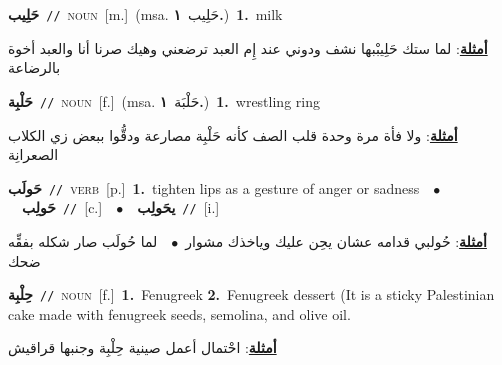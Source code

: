 \documentclass[10pt,a4paper,twoside]{article} %
\begin{document}
\begin{multicols}{2}
{\setlength\topsep{0pt}\textbf{\foreignlanguage{arabic}{حَلِيب}}\ {\color{gray}\texttt{//}\color{black}}\ \textsc{noun}\ [m.]\ \color{gray}(msa. \foreignlanguage{arabic}{حَلِيب}~\foreignlanguage{arabic}{\textbf{١.}})\color{black}\ \textbf{1.}~milk\  \begin{flushright}\color{gray}\foreignlanguage{arabic}{\textbf{\underline{\foreignlanguage{arabic}{أمثلة}}}: لما ستك حَلِيبْبها نشف ودوني عند إِم العبد ترضعني وهيك صرنا أنا والعبد أخوة بالرضاعة}\end{flushright}\color{black}} \vspace{2mm}

{\setlength\topsep{0pt}\textbf{\foreignlanguage{arabic}{حَلْبِة}}\ {\color{gray}\texttt{//}\color{black}}\ \textsc{noun}\ [f.]\ \color{gray}(msa. \foreignlanguage{arabic}{حَلْبَة}~\foreignlanguage{arabic}{\textbf{١.}})\color{black}\ \textbf{1.}~wrestling ring\  \begin{flushright}\color{gray}\foreignlanguage{arabic}{\textbf{\underline{\foreignlanguage{arabic}{أمثلة}}}: ولا فأة مرة وحدة قلب الصف كأنه حَلْبِة مصارعة ودقُّوا ببعض زي الكلاب الصعرانِة}\end{flushright}\color{black}} \vspace{2mm}

{\setlength\topsep{0pt}\textbf{\foreignlanguage{arabic}{حَولَب}}\ {\color{gray}\texttt{//}\color{black}}\ \textsc{verb}\ [p.]\ \textbf{1.}~tighten lips as a gesture of anger or sadness\ \ $\bullet$\ \ \setlength\topsep{0pt}\textbf{\foreignlanguage{arabic}{حَولِب}}\ {\color{gray}\texttt{//}\color{black}}\ [c.]\ \ $\bullet$\ \ \setlength\topsep{0pt}\textbf{\foreignlanguage{arabic}{يحَولِب}}\ {\color{gray}\texttt{//}\color{black}}\ [i.]\  \begin{flushright}\color{gray}\foreignlanguage{arabic}{\textbf{\underline{\foreignlanguage{arabic}{أمثلة}}}: حُولبي قدامه عشان يحِن عليك وياخذك مشوار\ $\bullet$\ \  لما حُولَب صار شكله بفقِّه ضحك}\end{flushright}\color{black}} \vspace{2mm}

{\setlength\topsep{0pt}\textbf{\foreignlanguage{arabic}{حِلْبِة}}\ {\color{gray}\texttt{//}\color{black}}\ \textsc{noun}\ [f.]\ \textbf{1.}~Fenugreek  \textbf{2.}~Fenugreek dessert (It is a sticky Palestinian cake made with fenugreek seeds, semolina, and olive oil.\  \begin{flushright}\color{gray}\foreignlanguage{arabic}{\textbf{\underline{\foreignlanguage{arabic}{أمثلة}}}: احْتمال أعمل صينية حِلْبِة وجنبها قراقيش}\end{flushright}\color{black}} \vspace{2mm}


\end{multicols}
\end{document}
